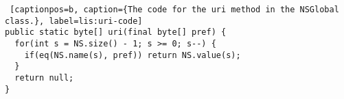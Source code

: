 \begin{lstlisting} [captionpos=b, caption={The code for the uri method in the NSGlobal class.}, label=lis:uri-code] 
public static byte[] uri(final byte[] pref) {
  for(int s = NS.size() - 1; s >= 0; s--) {
    if(eq(NS.name(s), pref)) return NS.value(s);
  }
  return null;
}
\end{lstlisting}
